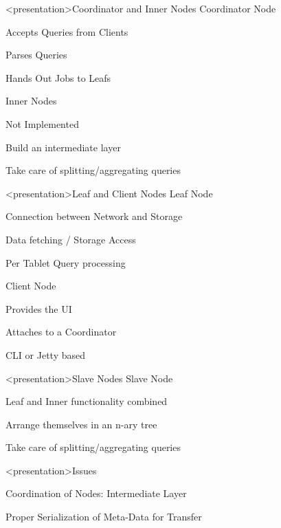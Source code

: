 \begin{frame}<presentation>{Coordinator and Inner Nodes}
  Coordinator Node
  \begin{niitemize}
    \item Accepts Queries from Clients
    \item Parses Queries
    \item Hands Out Jobs to Leafs
  \end{niitemize}
  Inner Nodes
  \begin{niitemize}
    \item Not Implemented
    \item Build an intermediate layer
    \item Take care of splitting/aggregating queries
  \end{niitemize}
\end{frame}

\begin{frame}<presentation>{Leaf and Client Nodes}
  Leaf Node
  \begin{niitemize}
    \item Connection between Network and Storage
    \item Data fetching / Storage Access
    \item Per Tablet Query processing
  \end{niitemize}
  Client Node
  \begin{niitemize}
    \item Provides the UI
    \item Attaches to a Coordinator
    \item CLI or Jetty based
  \end{niitemize}
\end{frame}

\begin{frame}<presentation>{Slave Nodes}
  Slave Node
  \begin{niitemize}
    \item Leaf and Inner functionality combined
    \item Arrange themselves in an n-ary tree
    \item Take care of splitting/aggregating queries
  \end{niitemize}
\end{frame}

\begin{frame}<presentation>{Issues}
\begin{niitemize}
 \item Coordination of Nodes: Intermediate Layer
 \item Proper Serialization of Meta-Data for Transfer
\end{niitemize}
\end{frame}



